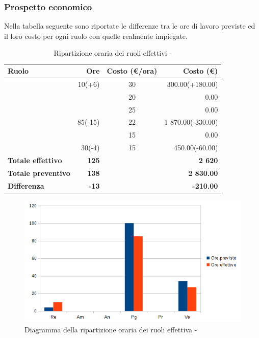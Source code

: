 \documentclass[12pt,a4paper]{article}
\begin{document}
\subsubsection{Prospetto economico}
Nella tabella seguente sono riportate le differenze tra le ore di lavoro previste ed il loro costo per ogni ruolo con quelle realmente impiegate.

\begin{table}[H]
	\begin{center}
		\begin{tabular}{l r c r}
			\toprule
			\textbf{Ruolo}	& \textbf{Ore} & \textbf{Costo (\euro/ora)}	& \textbf{Costo (\euro)} \\ \midrule
			\midrule	
			\RE{} & 10(+6) & 30 & 300.00(+180.00) \\ \midrule
			\AM{} & & 20 & 0.00 \\ \midrule
			\AN{} & & 25 & 0.00 \\ \midrule
			\PG{} & 85(-15) & 22 & 1 870.00(-330.00) \\ \midrule
			\PR{} & & 15 & 0.00 \\ \midrule
			\VR{} & 30(-4) & 15 & 450.00(-60.00) \\ \midrule
            \textbf{Totale effettivo} & \textbf{125} &  & \textbf{2 620} \\ \midrule
			\textbf{Totale preventivo} & \textbf{138} &  & \textbf{2 830.00} \\ \midrule
			\textbf{Differenza} & \textbf{-13} &  & \textbf{-210.00} \\ \midrule
			\bottomrule
		\end{tabular}
		\caption{Ripartizione oraria dei ruoli effettivi - \FPD{}}
	\end{center}
\end{table}

\begin{center}
	\begin{figure}[H]
		\centering
		\includegraphics[width=\textwidth]{../img/diagrammaBarreProgettazioneDiDettaglioConsuntivo.png}
		\caption{Diagramma della ripartizione oraria dei ruoli effettiva - \FPD{}}
	\end{figure}
\end{center}
\end{document}
